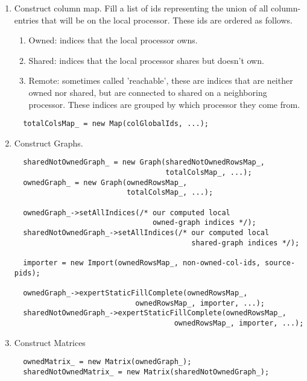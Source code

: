\begin{enumerate}
\item Construct column map.
  Fill a list of ids representing the union of all column-entries 
  that will be on the local processor. These ids are ordered as
  follows.
\begin{enumerate}
  \item Owned: indices that the local processor owns.
  \item Shared: indices that the local processor shares but doesn't own.
  \item Remote: sometimes called 'reachable', these are indices that
     are neither owned nor shared, but are connected to shared on
     a neighboring processor. These indices are grouped by which
     processor they come from.
\end{enumerate}

\begin{verbatim}
  totalColsMap_ = new Map(colGlobalIds, ...);
\end{verbatim}

\item Construct Graphs.
\begin{verbatim}
  sharedNotOwnedGraph_ = new Graph(sharedNotOwnedRowsMap_,
                                   totalColsMap_, ...);
  ownedGraph_ = new Graph(ownedRowsMap_,
                          totalColsMap_, ...);

  ownedGraph_->setAllIndices(/* our computed local
                                owned-graph indices */);
  sharedNotOwnedGraph_->setAllIndices(/* our computed local
                                         shared-graph indices */);

  importer = new Import(ownedRowsMap_, non-owned-col-ids, source-pids);

  ownedGraph_->expertStaticFillComplete(ownedRowsMap_,
                            ownedRowsMap_, importer, ...);
  sharedNotOwnedGraph_->expertStaticFillComplete(ownedRowsMap_,
                                     ownedRowsMap_, importer, ...);
\end{verbatim}

\item Construct Matrices
\begin{verbatim}
  ownedMatrix_ = new Matrix(ownedGraph_);
  sharedNotOwnedMatrix_ = new Matrix(sharedNotOwnedGraph_);
\end{verbatim}
\end{enumerate}

